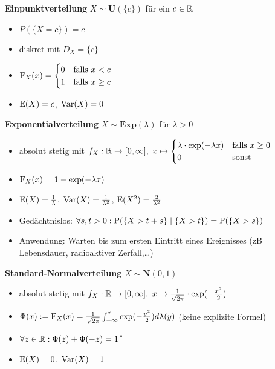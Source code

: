 \textbf{Einpunktverteilung} $X\sim\mathbf{U}(\{c\})$ für ein $c\in\R$
\begin{itemize}
\item $P(\{X=c\})=c$

\item diskret mit $D_X=\{c\}$

\item $\F_X(x)=\begin{cases}
0 	&\text{falls } x<c			\\
1	& \text{falls } x\geq c
\end{cases}$

\item $\E(X)=c$, $\Var(X)=0$
\end{itemize}

\textbf{Exponentialverteilung} $X\sim\mathbf{Exp}(\lambda)$ für $\lambda>0$
\begin{itemize}
\item absolut stetig mit
$f_X:\R\to [0,\infty],\ x\mapsto\begin{cases}
\lambda\cdot\exp(-\lambda x) 	& \text{falls } x\geq 0	\\
0							& \text{sonst }		
\end{cases}$

\item $\F_X(x)=1-\exp(-\lambda x)$

\item $\E(X)=\frac{1}{\lambda}$, $\Var(X)=\frac{1}{\lambda^2}$,
$\E(X^2)=\frac{2}{\lambda^2}$

\item Gedächtnislos: $\forall s,t>0:\P(\{X>t+s\}\mid\{X>t\})=\P(\{X>s\})$

\item Anwendung: Warten bis zum ersten Eintritt eines Ereignisses (zB Lebensdauer,
radioaktiver Zerfall,\ldots)
\end{itemize}

\textbf{Standard-Normalverteilung} $X\sim\mathbf{N}(0,1)$
\begin{itemize}
\item absolut stetig mit $f_X:\R\to[0,\infty],\
x\mapsto\frac{1}{\sqrt{2\pi}}\cdot\exp(-\frac{x^2}{2})$

\item $\Phi(x):=\F_X(x)=
\frac{1}{\sqrt{2\pi}}\int_{-\infty}^{x}\exp(-\frac{y^2}{2})d\lambda(y)$
(keine explizite Formel)

\item $\forall z\in\R:\Phi(z)+\Phi(-z)=1$ \U

\item $\E(X)=0$, $\Var(X)=1$

\end{itemize}

